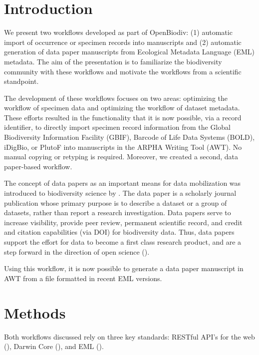 \section{Introduction}

We present two workflows developed as part of OpenBiodiv: (1) automatic import of occurrence or specimen records into manuscripts and (2) automatic generation of data paper manuscripts from Ecological Metadata Language (EML) metadata. The aim of the presentation is to familiarize the biodiversity community with these workflows and motivate the workflows from a scientific standpoint.

The development of these workflows focuses on two areas: optimizing the workflow of specimen data and optimizing the workflow of dataset metadata. These efforts resulted in the functionality that it is now possible, via a record identifier, to directly import specimen record information from the Global Biodiversity Information Facility (GBIF), Barcode of Life Data Systems (BOLD), iDigBio, or PlutoF into manuscripts in the ARPHA Writing Tool (AWT). No manual copying or retyping is required. Moreover, we created a second, data paper-based workflow.

The concept of data papers as an important means for data mobilization was introduced to biodiversity science by \cite{chavan_data_2011}. The data paper is a scholarly journal publication whose primary purpose is to describe a dataset or a group of datasets, rather than report a research investigation. Data papers serve to increase visibility, provide peer review, permanent scientific record, and credit and citation capabilities (via DOI) for biodiversity data. Thus, data papers support the effort for data to become a first class research product, and are a step forward in the direction of open science (\cite{chavan_data_2011,chavan_cultural_2013}).

Using this workflow, it is now possible to generate a data paper manuscript in AWT from a file formatted in recent EML versions.



\section{Methods}

Both workflows discussed  rely on three key standards: RESTful API's for the web (\cite{kurtz_what_2013}), Darwin Core (\cite{wieczorek_darwin_2012}), and EML (\cite{fegraus_maximizing_2005}).

